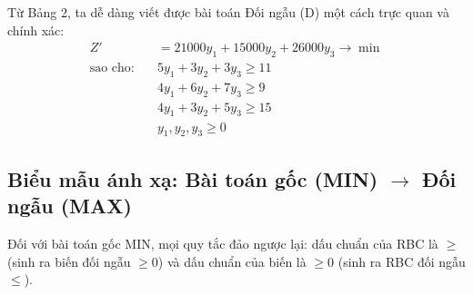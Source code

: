 \noindent Từ Bảng 2, ta dễ dàng viết được bài toán Đối ngẫu (D) một cách trực quan và chính xác:
\begin{align*}
    Z' &= 21000y_1 + 15000y_2 + 26000y_3 \rightarrow \min \\
\text{sao cho:} \quad
    &5y_1 + 3y_2 + 3y_3 \ge 11 \\
    &4y_1 + 6y_2 + 7y_3 \ge 9 \\
    &4y_1 + 3y_2 + 5y_3 \ge 15 \\
    &y_1, y_2, y_3 \ge 0
\end{align*}
\subsection{Biểu mẫu ánh xạ: Bài toán gốc (MIN) \texorpdfstring{$\longrightarrow$}{→} Đối ngẫu (MAX)}

Đối với bài toán gốc MIN, mọi quy tắc đảo ngược lại: dấu chuẩn của RBC là $\ge$ (sinh ra biến đối ngẫu $\ge 0$) và dấu chuẩn của biến là $\ge 0$ (sinh ra RBC đối ngẫu $\le$).

